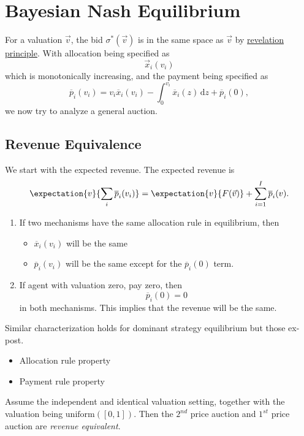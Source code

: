 \section{Bayesian Nash Equilibrium}
\begin{prev}
	For a valuation \(\vec{v}\), the bid \(\sigma^{*}(\vec{v})\) is in the same space as \(\vec{v}\) by \hyperref[Revelation-Principle]{revelation principle}.
	With allocation being specified as
	\[
		\vec{x}_{i}(v_{i})
	\]
	which is monotonically increasing, and the payment being specified as
	\[
		\overline{p}_{i}(v_{i}) = v_{i}\overline{x}_{i}(v_{i}) - \int_0^{v_{i}}\overline{x}_{i}(z)\,\mathrm{d}z + \overline{p}_{i}(0),
	\]
	we now try to analyze a general auction.
\end{prev}

\subsection{Revenue Equivalence}
We start with the expected revenue. The expected revenue is
\[
	\expectation{v}{\sum\limits_{i}\overline{p}_{i}(v_{i}) } = \expectation{v}{F(\vec{v})} + \sum\limits_{i=1}^{I} \overline{p}_{i}(v).
\]
\begin{enumerate}
	\item If two mechanisms have the same allocation rule in equilibrium, then
	      \begin{itemize}
		      \item \(\overline{x}_{i}(v_{i})\) will be the same
		      \item \(\overline{p}_{i}(v_{i})\) will be the same except for the \(\overline{p}_{i}(0)\) term.
	      \end{itemize}
	\item If agent with valuation zero, pay zero, then
	      \[
		      \overline{p}_{i}(0) = 0
	      \]
	      in both mechanisms. This implies that the revenue will be the same.
\end{enumerate}

\begin{note}
	Similar characterization holds for dominant strategy equilibrium but those ex-post.
	\begin{itemize}
		\item Allocation rule property
		\item Payment rule property
	\end{itemize}
\end{note}

Assume the independent and identical valuation setting, together with the valuation being \(\mathrm{uniform}([0,1])\). Then the \(2^{nd}\) price auction
and \(1^{st}\) price auction are \emph{revenue equivalent}.

